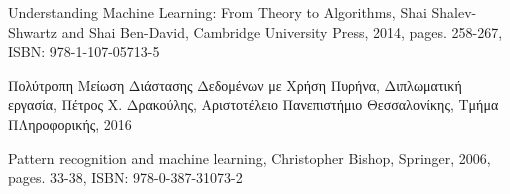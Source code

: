 \documentclass[12pt]{article}
\begin{document}
\pagebreak

\begin{thebibliography}{9}
	Understanding Machine Learning: From Theory to Algorithms, 
	Shai Shalev-Shwartz and Shai Ben-David,
	Cambridge University Press, 2014,
	pages. 258-267, 
	ISBN: 978-1-107-05713-5
	
	Πολύτροπη Μείωση Διάστασης Δεδομένων με Χρήση Πυρήνα,
	Διπλωματική εργασία, 
	Πέτρος Χ. Δρακούλης,
	Αριστοτέλειο Πανεπιστήμιο Θεσσαλονίκης, Τμήμα ΠΛηροφορικής, 2016
	
	Pattern recognition and machine learning, 	
	Christopher Bishop,
	Springer, 2006,
	pages. 33-38, 
	ISBN: 978-0-387-31073-2
	
\end{thebibliography}
\end{document}
